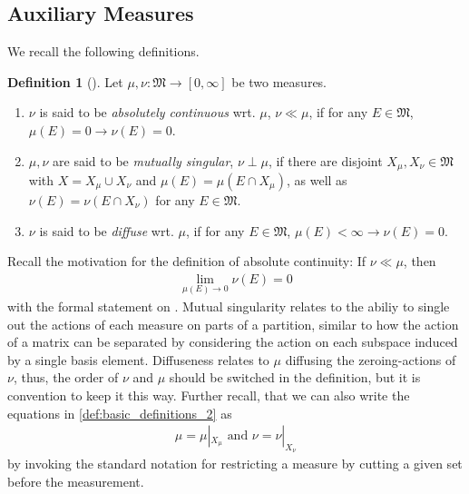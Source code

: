 \documentclass[10pt, leqno]{amsart}
\theoremstyle{definition}
\newtheorem{definition}{Definition}[section]
\theoremstyle{remark}
\begin{document}
    \subsection{Auxiliary Measures} We recall the following definitions.
    \begin{definition}[{\cite[p. 55]{Fonseca}}] \label{def:basic_definitions}
        Let \(\mu, \nu\colon \mathfrak{M} \to [0, \infty]\) be two measures.
        \begin{enumerate}[label=(\roman*), wide]
            \item \(\nu\) is said to be \emph{absolutely continuous} wrt. \(\mu\), \(\nu \ll \mu\), if for any \(E \in \mathfrak{M}\), \(\mu(E) = 0 \rightarrow \nu(E) = 0\).
            \item \label{def:basic_definitions_2} \(\mu, \nu\) are said to be \emph{mutually singular}, \(\nu \perp \mu\), if there are disjoint \(X_\mu, X_\nu \in \mathfrak{M}\) with \(X = X_\mu \cup X_\nu\) and \(\mu(E) = \mu(E \cap X_\mu)\), as well as \(\nu(E) = \nu(E \cap X_\nu)\) for any \(E \in \mathfrak{M}\).
            \item \(\nu\) is said to be \emph{diffuse} wrt. \(\mu\), if for any \(E \in \mathfrak{M}\), \(\mu(E) < \infty \rightarrow \nu(E) = 0\).
        \end{enumerate}
    \end{definition}

    Recall the motivation for the definition of absolute continuity: If \(\nu \ll \mu\), then
    \begin{align}
        \lim_{\mu(E) \to 0} \nu(E) = 0
    \end{align}
    with the formal statement on \cite[pp. 55-56]{Fonseca}. Mutual singularity relates to the abiliy to single out the actions of each measure on parts of a partition, similar to how the action of a matrix can be separated by considering the action on each subspace induced by a single basis element. Diffuseness relates to \(\mu\) diffusing the zeroing-actions of \(\nu\), thus, the order of \(\nu\) and \(\mu\) should be switched in the definition, but it is convention to keep it this way. Further recall, that we can also write the equations in  \ref{def:basic_definitions_2} as
    \begin{align}
        \mu = \mu|_{X_\mu} \text{ and } \nu = \nu|_{X_\nu}
    \end{align}
    by invoking the standard notation for restricting a measure by cutting a given set before the measurement.
    
\end{document}
